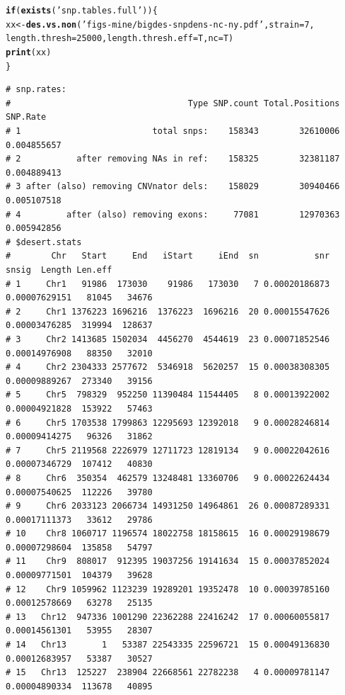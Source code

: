 \documentclass{article}\usepackage[]{graphicx}\usepackage[]{color}
\makeatletter
\newcommand{\hlnum}[1]{\textcolor[rgb]{0.686,0.059,0.569}{#1}}%
\newcommand{\hlstr}[1]{\textcolor[rgb]{0.192,0.494,0.8}{#1}}%
\newcommand{\hlstd}[1]{\textcolor[rgb]{0.345,0.345,0.345}{#1}}%
\newcommand{\hlkwa}[1]{\textcolor[rgb]{0.161,0.373,0.58}{\textbf{#1}}}%
\newcommand{\hlkwb}[1]{\textcolor[rgb]{0.69,0.353,0.396}{#1}}%
\newcommand{\hlkwc}[1]{\textcolor[rgb]{0.333,0.667,0.333}{#1}}%
\newcommand{\hlkwd}[1]{\textcolor[rgb]{0.737,0.353,0.396}{\textbf{#1}}}%
\newenvironment{kframe}{%
 \def\at@end@of@kframe{}%
 \ifinner\ifhmode%
  \def\at@end@of@kframe{\end{minipage}}%
  \begin{minipage}{\columnwidth}%
 \fi\fi%
 \def\FrameCommand##1{\hskip\@totalleftmargin \hskip-\fboxsep
 \colorbox{shadecolor}{##1}\hskip-\fboxsep
     \hskip-\linewidth \hskip-\@totalleftmargin \hskip\columnwidth}%
 \MakeFramed {\advance\hsize-\width
   \@totalleftmargin\z@ \linewidth\hsize
   \@setminipage}}%
 {\par\unskip\endMakeFramed%
 \at@end@of@kframe}
\newenvironment{knitrout}{}{} %
\makeatother
\begin{document}
\begin{knitrout}\footnotesize
{}\color{fgcolor}\begin{kframe}
\begin{alltt}
\hlkwa{if}\hlstd{(}\hlkwd{exists}\hlstd{(}\hlstr{'snp.tables.full'}\hlstd{))\{}
  \hlstd{xx} \hlkwb{<-} \hlkwd{des.vs.non}\hlstd{(}\hlstr{'figs-mine/bigdes-snpdens-nc-ny.pdf'}\hlstd{,} \hlkwc{strain}\hlstd{=}\hlnum{7}\hlstd{,}
                   \hlkwc{length.thresh}\hlstd{=}\hlnum{25000}\hlstd{,} \hlkwc{length.thresh.eff}\hlstd{=T,} \hlkwc{nc}\hlstd{=T)}
  \hlkwd{print}\hlstd{(xx)}
\hlstd{\}}
\end{alltt}
\begin{verbatim}
# snp.rates:
#                                   Type SNP.count Total.Positions    SNP.Rate
# 1                          total snps:    158343        32610006 0.004855657
# 2           after removing NAs in ref:    158325        32381187 0.004889413
# 3 after (also) removing CNVnator dels:    158029        30940466 0.005107518
# 4         after (also) removing exons:     77081        12970363 0.005942856
# $desert.stats
#        Chr   Start     End   iStart     iEnd  sn           snr         snsig  Length Len.eff
# 1     Chr1   91986  173030    91986   173030   7 0.00020186873 0.00007629151   81045   34676
# 2     Chr1 1376223 1696216  1376223  1696216  20 0.00015547626 0.00003476285  319994  128637
# 3     Chr2 1413685 1502034  4456270  4544619  23 0.00071852546 0.00014976908   88350   32010
# 4     Chr2 2304333 2577672  5346918  5620257  15 0.00038308305 0.00009889267  273340   39156
# 5     Chr5  798329  952250 11390484 11544405   8 0.00013922002 0.00004921828  153922   57463
# 6     Chr5 1703538 1799863 12295693 12392018   9 0.00028246814 0.00009414275   96326   31862
# 7     Chr5 2119568 2226979 12711723 12819134   9 0.00022042616 0.00007346729  107412   40830
# 8     Chr6  350354  462579 13248481 13360706   9 0.00022624434 0.00007540625  112226   39780
# 9     Chr6 2033123 2066734 14931250 14964861  26 0.00087289331 0.00017111373   33612   29786
# 10    Chr8 1060717 1196574 18022758 18158615  16 0.00029198679 0.00007298604  135858   54797
# 11    Chr9  808017  912395 19037256 19141634  15 0.00037852024 0.00009771501  104379   39628
# 12    Chr9 1059962 1123239 19289201 19352478  10 0.00039785160 0.00012578669   63278   25135
# 13   Chr12  947336 1001290 22362288 22416242  17 0.00060055817 0.00014561301   53955   28307
# 14   Chr13       1   53387 22543335 22596721  15 0.00049136830 0.00012683957   53387   30527
# 15   Chr13  125227  238904 22668561 22782238   4 0.00009781147 0.00004890334  113678   40895

\end{verbatim}
\end{kframe}
\end{knitrout}
\end{document}
